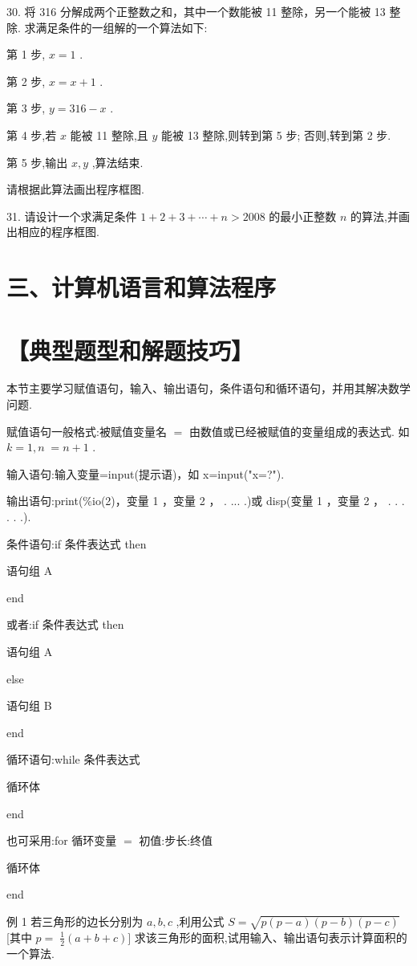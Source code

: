 \documentclass[10pt]{article}
\begin{document}
30. 将 316 分解成两个正整数之和，其中一个数能被 11 整除，另一个能被 13 整除. 求满足条件的一组解的一个算法如下:

第 1 步, \(x = 1\) .

第 2 步, \(x = x + 1\) .

第 3 步, \(y = {316} - x\) .

第 4 步,若 \(x\) 能被 11 整除,且 \(y\) 能被 13 整除,则转到第 5 步; 否则,转到第 2 步.

第 5 步,输出 \(x,y\) ,算法结束.

请根据此算法画出程序框图.

31. 请设计一个求满足条件 \(1 + 2 + 3 + \cdots  + n > {2008}\) 的最小正整数 \(n\) 的算法,并画出相应的程序框图.

\section*{三、计算机语言和算法程序}

\section*{【典型题型和解题技巧】}

本节主要学习赋值语句，输入、输出语句，条件语句和循环语句，并用其解决数学问题.

赋值语句一般格式:被赋值变量名 \(=\) 由数值或已经被赋值的变量组成的表达式. 如 \(k = 1,n \; = n + 1\) .

输入语句:输入变量=input(提示语)，如 x=input("x=?").

输出语句:print(\%io(2)，变量 1 ，变量 2 ， . ... .)或 disp(变量 1 ，变量 2 ， . . . . . .).

条件语句:if 条件表达式 then

语句组 A

end

或者:if 条件表达式 then

语句组 A

else

语句组 B

end

循环语句:while 条件表达式

循环体

end

也可采用:for 循环变量 \(=\) 初值:步长:终值

循环体

end

例 1 若三角形的边长分别为 \(a,b,c\) ,利用公式 \(S = \sqrt{p\left( {p - a}\right) \left( {p - b}\right) \left( {p - c}\right) }\) [其中 \(p = \; \frac{1}{2}\left( {a + b + c}\right) \rbrack\) 求该三角形的面积,试用输入、输出语句表示计算面积的一个算法.
\end{document}
